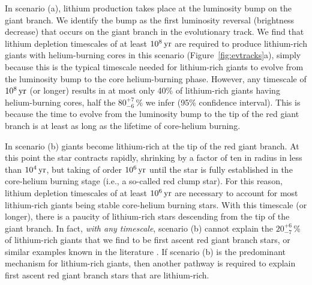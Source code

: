 \documentclass[twocolumn]{aastex62}
\begin{document}
In scenario (a), lithium 
production takes place at the luminosity bump on the giant branch. We identify the bump 
as the first luminosity reversal (brightness decrease) that occurs on the giant branch in the evolutionary track.
We find that lithium depletion timescales of at least $10^8\,{\rm yr}$ are 
required to produce lithium-rich giants with helium-burning cores in this scenario (Figure~\ref{fig:evtracks}a), simply because this is the typical timescale needed for
lithium-rich giants to evolve from the luminosity bump to the core helium-burning phase.
However, any timescale of $10^8\,{\rm yr}$ (or longer) results in at most only 40\% of lithium-rich giants having helium-burning cores, half the $80^{+7}_{-6}$\,\% we infer (95\% confidence interval).
This is because the time to evolve from the luminosity bump to the tip of the red giant branch is at least as long as the lifetime of core-helium burning.


In scenario (b) giants become lithium-rich at the tip of the red giant branch. At this point 
the star contracts rapidly, shrinking by a factor of ten in radius in less than $10^4\,{\rm yr}$,
but taking of order $10^6\,{\rm yr}$ until the star is fully established in the core-helium burning stage (i.e., a so-called red clump star). For this reason, lithium depletion timescales of at least $10^6\,{\rm yr}$ are necessary to account for most lithium-rich giants being stable core-helium burning stars. With this timescale (or longer), there is a paucity of lithium-rich stars descending from the tip of the giant branch. In fact, \emph{with any timescale}, scenario (b) cannot explain the $20^{+6}_{-7}$\,\% of lithium-rich giants that we find to be first ascent red giant branch stars, or similar examples known in the literature \citep[e.g.,][]{Kirby_2016}. If scenario (b) is the predominant mechanism for lithium-rich giants, then another pathway is required to explain first ascent red giant branch stars that are lithium-rich.
\end{document}
